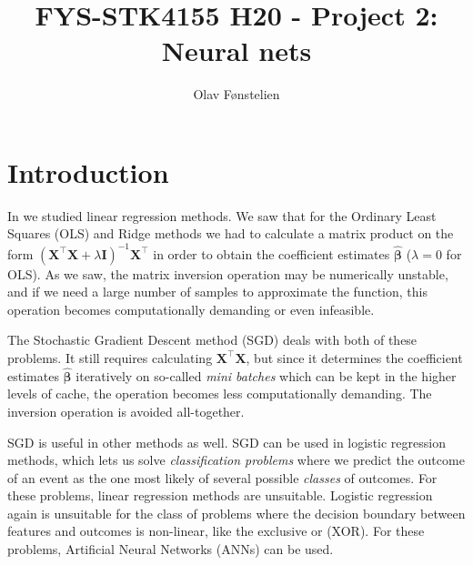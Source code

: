 \documentclass[]{article}
\title{FYS-STK4155 H20 - Project 2:\\Neural nets}
\author{Olav Fønstelien}
\begin{document}
\maketitle

\begin{abstract}

\end{abstract}

\section{Introduction} \label{intro}

In \cite{project1} we studied linear regression methods. We saw that for the Ordinary Least Squares (OLS) and Ridge methods we had to calculate a matrix product on the form $(\mathbf{X}^\intercal \mathbf{X} + \lambda \mathbf{I})^{-1} \mathbf{X}^\intercal$ in order to obtain the coefficient estimates $\mathbf{\hat{\beta}}$ ($\lambda = 0$ for OLS). As we saw, the matrix inversion operation may be numerically unstable, and if we need a large number of samples to approximate the function, this operation becomes computationally demanding or even infeasible. 

The Stochastic Gradient Descent method (SGD) deals with both of these problems. It still requires calculating $\mathbf{X}^\intercal \mathbf{X}$, but since it determines the coefficient estimates $\mathbf{\hat{\beta}}$ iteratively on so-called \textit{mini batches} which can be kept in the higher levels of cache, the operation becomes less computationally demanding. The inversion operation is avoided all-together. 

SGD is useful in other methods as well. SGD can be used in logistic regression methods, which lets us solve \textit{classification problems} where we predict the outcome of an event as the one most likely of several possible \textit{classes} of outcomes. For these problems, linear regression methods are unsuitable. Logistic regression again is unsuitable for the class of problems where the decision boundary between features and outcomes is non-linear, like the exclusive or (XOR). For these problems, Artificial Neural Networks (ANNs) can be used.
\end{document}

